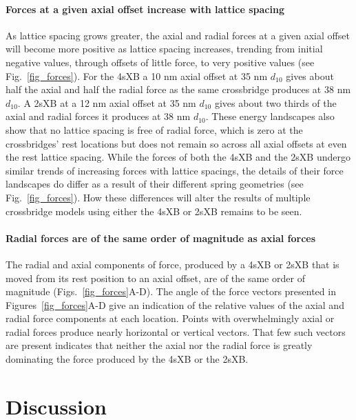 \documentclass[]{article}
\begin{document}
\paragraph{Forces at a given axial offset increase with lattice spacing} %
As lattice spacing grows greater, the axial and radial forces at a given axial offset will become more positive as lattice spacing increases, trending from initial negative values, through offsets of little force, to very positive values (see Fig.~\ref{fig_forces}). 
For the 4sXB a 10 nm axial offset at 35 nm $d_{10}$ gives about half the axial and half the radial force as the same crossbridge produces at 38 nm $d_{10}$. 
A 2sXB at a 12 nm axial offset at 35 nm $d_{10}$ gives about two thirds of the axial and radial forces it produces at 38 nm $d_{10}$. 
These energy landscapes also show that no lattice spacing is free of radial force, which is zero at the crossbridges' rest locations but does not remain so across all axial offsets at even the rest lattice spacing. 
While the forces of both the 4sXB and the 2sXB undergo similar trends of increasing forces with lattice spacings, the details of their force landscapes do differ as a result of their different spring geometries (see Fig.~\ref{fig_forces}). 
How these differences will alter the results of multiple crossbridge models using either the 4sXB or 2sXB remains to be seen. 


\paragraph{Radial forces are of the same order of magnitude as axial forces} %
The radial and axial components of force, produced by a 4sXB or 2sXB that is moved from its rest position to an axial offset, are of the same order of magnitude (Figs.~\ref{fig_forces}A-D). 
The angle of the force vectors presented in Figures~\ref{fig_forces}A-D give an indication of the relative values of the axial and radial force components at each location.
Points with overwhelmingly axial or radial forces produce nearly horizontal or vertical vectors.
That few such vectors are present indicates that neither the axial nor the radial force is greatly dominating the force produced by the 4sXB or the 2sXB.



\section{Discussion} %
\end{document}
